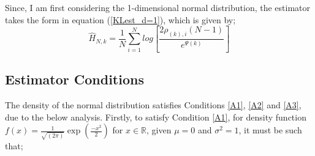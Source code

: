 \documentclass{report}
\begin{document}
Since, I am first considering the 1-dimensional normal distribution, the estimator takes the form in equation (\ref{KLest_d=1}), which is given by;
\begin{equation}
\hat{H}_{N, k} =  \frac{1}{N} \sum_{i=1}^{N} log \left[ \frac{2\rho_{(k),i}(N-1)}{e^{\Psi(k)}} \right]\nonumber
\end{equation}







\subsection{Estimator Conditions} 

The density of the normal distribution satisfies Conditions \ref{A1}, \ref{A2} and \ref{A3}, due to the below analysis. Firstly, to satisfy Condition \ref{A1}, for density function $f(x) = \frac{1}{\sqrt{(2\pi)}} \exp{ \left( \frac{-x^2}{2} \right)}$ for $x \in \mathbb{R}$, given $\mu = 0$ and $\sigma^2 = 1$, it must be such that;
\end{document}

